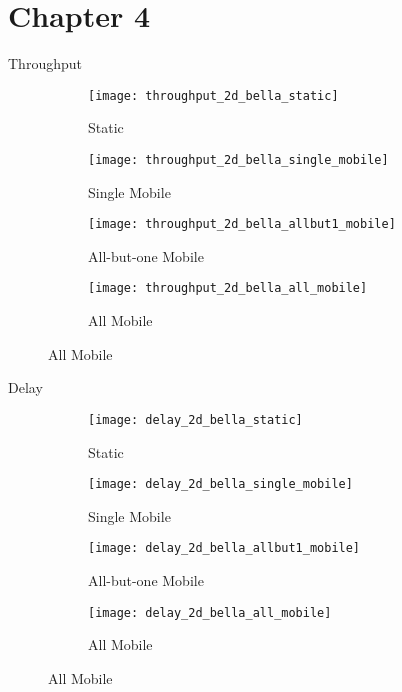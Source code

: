 \documentclass[aspectratio=169]{beamer}
\begin{document}
\section{Chapter 4}
\begin{frame}{Throughput}
	\begin{figure}[h]
		\begin{subfigure}[t]{0.3\textwidth}
			\centering
			\texttt{[image: throughput\_2d\_bella\_static]}
			\caption{Static}
			\label{fig:throughput_2d_bella_static}
		\end{subfigure}
		\begin{subfigure}[t]{0.3\textwidth}
			\centering
			\texttt{[image: throughput\_2d\_bella\_single\_mobile]}
			\caption{Single Mobile}
			\label{fig:throughput_2d_bella_single_mobile}
		\end{subfigure}
		
		\begin{subfigure}[t]{0.3\textwidth}
			\centering
			\texttt{[image: throughput\_2d\_bella\_allbut1\_mobile]}
			\caption{All-but-one Mobile}
			\label{fig:throughput_2d_bella_allbut1_mobile}
		\end{subfigure}
		\begin{subfigure}[t]{0.3\textwidth}
			\centering
			\texttt{[image: throughput\_2d\_bella\_all\_mobile]}
			\caption{All Mobile}
			\label{fig:throughput_2d_bella_all_mobile}
		\end{subfigure}
		\label{fig:2d_throughput}
	\end{figure}
\end{frame}

\begin{frame}{Delay}
	\begin{figure}[h]
		\begin{subfigure}[t]{0.3\textwidth}
			\centering
			\texttt{[image: delay\_2d\_bella\_static]}
			\caption{Static}
			\label{fig:delay_2d_bella_static}
		\end{subfigure}
		\begin{subfigure}[t]{0.3\textwidth}
			\centering
			\texttt{[image: delay\_2d\_bella\_single\_mobile]}
			\caption{Single Mobile}
			\label{fig:delay_2d_bella_single_mobile}
		\end{subfigure}
		
		\begin{subfigure}[t]{0.3\textwidth}
			\centering
			\texttt{[image: delay\_2d\_bella\_allbut1\_mobile]}
			\caption{All-but-one Mobile}
			\label{fig:delay_2d_bella_allbut1_mobile}
		\end{subfigure}
		\begin{subfigure}[t]{0.3\textwidth}
			\centering
			\texttt{[image: delay\_2d\_bella\_all\_mobile]}
			\caption{All Mobile}
			\label{fig:delay_2d_bella_all_mobile}
		\end{subfigure}
		\label{fig:2d_delay}
	\end{figure}
\end{frame}
\end{document}
